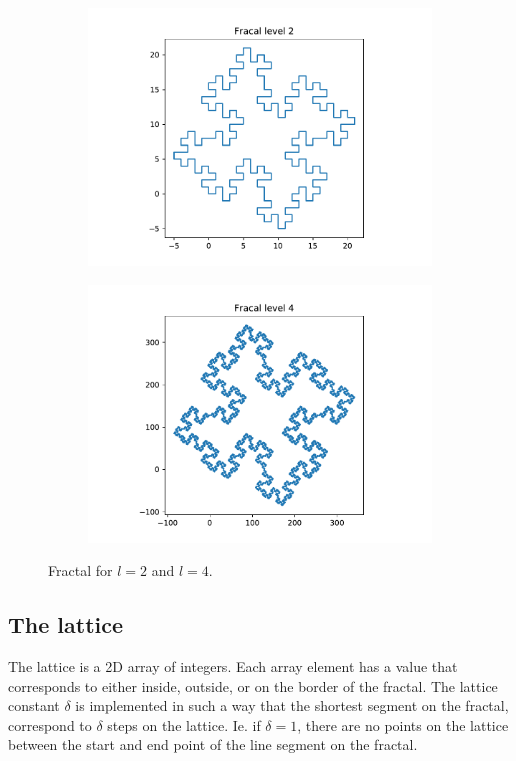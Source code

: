 \documentclass[a4paper, 12pt]{article}
\begin{document}
\begin{figure}[h]
  \centering
  \begin{subfigure}[b]{.49\textwidth}
      \includegraphics[width=\textwidth]{media/fractal_l2}
  \end{subfigure}
  \begin{subfigure}[b]{.49\textwidth}
      \includegraphics[width=\textwidth]{media/fractal_l4}
  \end{subfigure}
  \caption{Fractal for $l=2$ and $l=4$.}
\end{figure}

\subsection{The lattice\label{sec:lattice}}
The lattice is a 2D array of integers.
Each array element has a value that corresponds to either inside, outside, or on the border of the fractal.
The lattice constant $\delta$ is implemented in such a way that the shortest segment on the fractal, correspond to $\delta$ steps on the lattice.
Ie. if $\delta=1$, there are no points on the lattice between the start and end point of the line segment on the fractal.
\end{document}
